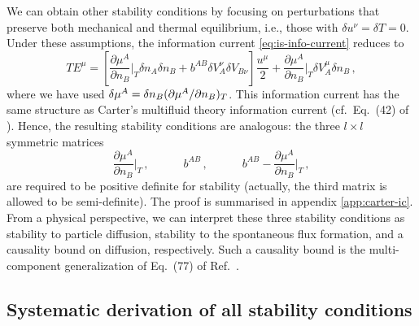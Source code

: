 \documentclass[
a4paper,
amsfonts,
amsmath,
reprint,
showkeys,
nofootinbib,
twoside,
onecolumn,
notitlepage
]{revtex4-1}
\newcommand{\spc}{\quad \quad \quad}
\begin{document}
	We can obtain other stability conditions by focusing on perturbations that preserve both mechanical and thermal equilibrium, i.e., those with $\delta u^\nu = \delta T=0$. 
	Under these assumptions, the information current \eqref{eq:is-info-current} reduces to
	\begin{equation}\label{eq:is-info-current-diff}
		TE^\mu = \left[ \dfrac{\partial \mu^A}{\partial n_B}\bigg|_T \delta n_A \delta n_B + b^{AB} \delta V_A^\nu \delta V_{B\nu} \right]\dfrac{u^\mu}{2} +\dfrac{\partial \mu^A}{\partial n_B}\bigg|_T \delta V_A^\mu \delta n_B \,,
	\end{equation}
	where we have used $\delta\mu^A=\delta n_B(\partial \mu^A/{\partial n_B})_T$.
	This information current has the same structure as Carter's multifluid theory information current  (cf.\ Eq.\ (42) of \cite{GavassinoStabilityCarter2022}). 
	Hence, the resulting stability conditions are analogous: the three $l \times l$ symmetric matrices 
	\begin{equation}\label{eq:diff-stability}
		\dfrac{\partial \mu^A}{\partial n_B}\bigg|_T \, , \spc b^{AB} \, , \spc b^{AB}- \dfrac{\partial \mu^A}{\partial n_B}\bigg|_T\,, 
	\end{equation}
	are required to be positive definite for stability (actually, the third matrix is allowed to be semi-definite).
	The proof is summarised in appendix \ref{app:carter-ic}. 
	From a physical perspective, we can interpret these three stability conditions as stability to particle diffusion, stability to the spontaneous flux formation, and a causality bound on diffusion, respectively.
	Such a causality bound is the multi-component generalization of Eq.\ (77) of Ref.\ \cite{BritoDenicol2020}.
	
	
	
	\subsection{Systematic derivation of all stability conditions}
	
\end{document}

